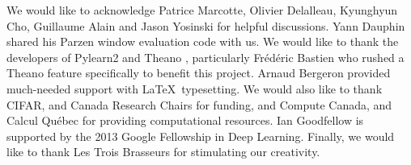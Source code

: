 We would like to acknowledge Patrice Marcotte, Olivier Delalleau, Kyunghyun Cho, Guillaume Alain and Jason Yosinski for helpful discussions. Yann Dauphin shared his Parzen window evaluation code with us. We would like to thank the developers of Pylearn2 \cite{12_goodfellow2013pylearn2machinelearningresearch} and Theano \cite{7_bergstra-proc-scipy-2010,1_bastien2012theanonewfeaturesspeed}, particularly Frédéric Bastien who rushed a Theano feature specifically to benefit this project. Arnaud Bergeron provided much-needed support with \LaTeX\ typesetting.  We would also like to thank CIFAR, and Canada Research Chairs for funding, and Compute Canada, and Calcul Québec for providing computational resources. Ian Goodfellow is supported by the 2013 Google Fellowship in Deep Learning. Finally, we would like to thank Les Trois Brasseurs for stimulating our creativity.
